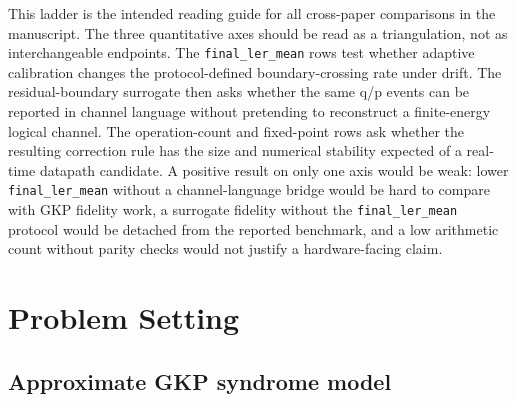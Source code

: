 \documentclass[11pt]{article}
\newcommand{\finalLER}{\texttt{final\_ler\_mean}}
\begin{document}
This ladder is the intended reading guide for all cross-paper comparisons in
the manuscript.  The three quantitative axes should be read as a triangulation,
not as interchangeable endpoints.  The \finalLER{} rows test whether adaptive
calibration changes the protocol-defined boundary-crossing rate under drift.
The residual-boundary surrogate then asks whether the same q/p events can be
reported in channel language without pretending to reconstruct a finite-energy
logical channel.  The operation-count and fixed-point rows ask whether the
resulting correction rule has the size and numerical stability expected of a
real-time datapath candidate.  A positive result on only one axis would be weak:
lower \finalLER{} without a channel-language bridge would be hard to compare
with GKP fidelity work, a surrogate fidelity without the \finalLER{} protocol
would be detached from the reported benchmark, and a low arithmetic count
without parity checks would not justify a hardware-facing claim.

\section{Problem Setting}

\subsection{Approximate GKP syndrome model}
\end{document}
